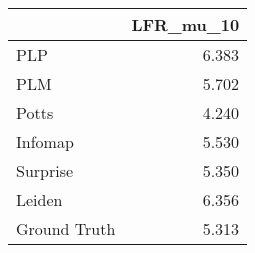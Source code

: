 \begin{tabular}{lr}
\toprule
{} & LFR_mu_10 \\
\midrule
PLP          &     6.383 \\
PLM          &     5.702 \\
Potts        &     4.240 \\
Infomap      &     5.530 \\
Surprise     &     5.350 \\
Leiden       &     6.356 \\
Ground Truth &     5.313 \\
\bottomrule
\end{tabular}
